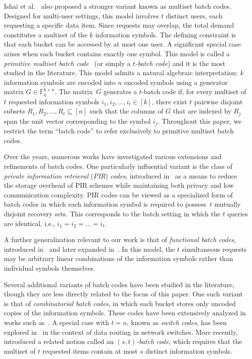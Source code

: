 \documentclass[11pt,a4paper]{article}
\theoremstyle{definition}
\begin{document}
Ishai et al.~\cite{IKOS04} also proposed a stronger variant known as multiset batch codes. Designed for multi-user settings, this model involves $t$ distinct users, each requesting a specific data item. Since requests may overlap, the total demand constitutes a multiset of the $k$ information symbols. The defining constraint is that each bucket can be accessed by at most one user. A significant special case arises when each bucket contains exactly one symbol. This model is called a \textit{primitive multiset batch code}~\cite{IKOS04} (or simply a \emph{$t$-batch code}) and it is the most studied in the literature.  This model admits a natural algebraic interpretation: $k$ information symbols are encoded into $n$ encoded symbols using a generator matrix $G \in \mathbb{F}_q^{k \times n}$. The matrix~$G$ generates a $t$-batch code if, for every multiset of $t$ requested information symbols $i_1, i_2, \dots, i_t \in [k]$, there exist $t$ pairwise disjoint subsets $R_1, R_2, \dots, R_t \subseteq [n]$ such that the columns of $G$ that are indexed by $R_j$ span the unit vector corresponding to the symbol $i_j$. Throughout this paper, we restrict the term ``batch code'' to refer exclusively to primitive multiset batch codes.

Over the years, numerous works have investigated various extensions and refinements of batch codes. One particularly influential variant is the class of \emph{private information retrieval} (\textit{PIR}) \textit{codes}, introduced in~\cite{FAZELI2015,fazeli2015codes,vardy2023private} as a means to reduce the storage overhead of PIR schemes while maintaining both privacy and low communication complexity. PIR codes can be viewed as a specialized form of batch codes in which each information symbol is required to possess~$t$ mutually disjoint recovery sets. This corresponds to the batch setting in which the $t$ queries are identical, i.e., $i_1 = i_2 = \dots = i_t$.

A further generalization relevant to our work is that of \emph{functional batch codes}, introduced in~\cite{YAAKOBI2020} and later expanded in~\cite{Lev2022}. In this model, the $t$ simultaneous requests may be arbitrary linear combinations of the information symbols rather than individual symbols themselves.

Several additional variants of batch codes have been studied in the literature, though they are less directly related to the focus of this paper. One such variant is that of \emph{combinatorial batch codes}, in which each bucket stores only uncoded copies of the information symbols. These codes have been extensively analyzed in works such as~\cite{stinson2009combinatorial,BSB2011,silberstein2016optimal,shangguan2020sparse,chee2020lower}. A special case with $t = n$, known as \emph{switch codes}, has been explored in~\cite{wang2013codes,wang2015optimal,chee2015combinatorial,buzaglo2017consecutive} in the context of data routing in network switches. More recently,~\cite{kong2024bounds} introduced a related notion called an \emph{$(s,t)$-batch code}, which requires that the multiset of $t$ requested items contain at most $s$ distinct information symbols.
\end{document}
